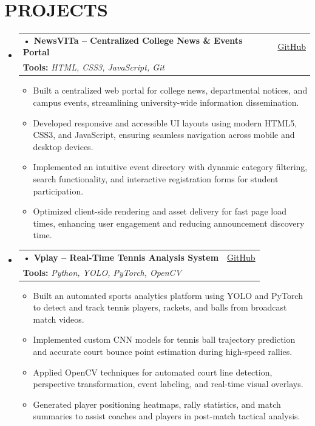 \documentclass[letterpaper,10pt]{article}
\makeatletter
\newcommand{\resumeItem}[1]{
  \item\small{
    {#1 \vspace{-1pt}}
  }
}
\newcommand{\resumeProjectHeading}[3]{
    \vspace{-1pt}\item[]
    \begin{tabular*}{0.98\textwidth}[t]{l@{\extracolsep{\fill}}r}
      \textbf{#1} & #3 \\
      \multicolumn{2}{l}{\small \textbf{Tools:} \textit{#2}} \\
    \end{tabular*}\vspace{-3pt}
}
\makeatother
\begin{document}
\section{PROJECTS}
    \begin{itemize}[label={}]
      
      \resumeProjectHeading
          {• NewsVITa -- Centralized College News \& Events Portal}
          {HTML, CSS3, JavaScript, Git}
          {\href{https://github.com/}{\underline{GitHub}}}
          \begin{itemize}
            \resumeItem{Built a centralized web portal for college news, departmental notices, and campus events, streamlining university-wide information dissemination.}
            \resumeItem{Developed responsive and accessible UI layouts using modern HTML5, CSS3, and JavaScript, ensuring seamless navigation across mobile and desktop devices.}
            \resumeItem{Implemented an intuitive event directory with dynamic category filtering, search functionality, and interactive registration forms for student participation.}
            \resumeItem{Optimized client-side rendering and asset delivery for fast page load times, enhancing user engagement and reducing announcement discovery time.}
          \end{itemize}

      \vspace{2.5pt}

      \resumeProjectHeading
          {• Vplay -- Real-Time Tennis Analysis System}
          {Python, YOLO, PyTorch, OpenCV}
          {\href{https://github.com/}{\underline{GitHub}}}
          \begin{itemize}
            \resumeItem{Built an automated sports analytics platform using YOLO and PyTorch to detect and track tennis players, rackets, and balls from broadcast match videos.}
            \resumeItem{Implemented custom CNN models for tennis ball trajectory prediction and accurate court bounce point estimation during high-speed rallies.}
            \resumeItem{Applied OpenCV techniques for automated court line detection, perspective transformation, event labeling, and real-time visual overlays.}
            \resumeItem{Generated player positioning heatmaps, rally statistics, and match summaries to assist coaches and players in post-match tactical analysis.}
          \end{itemize}

      \vspace{2.5pt}


\end{itemize}
\end{document}
